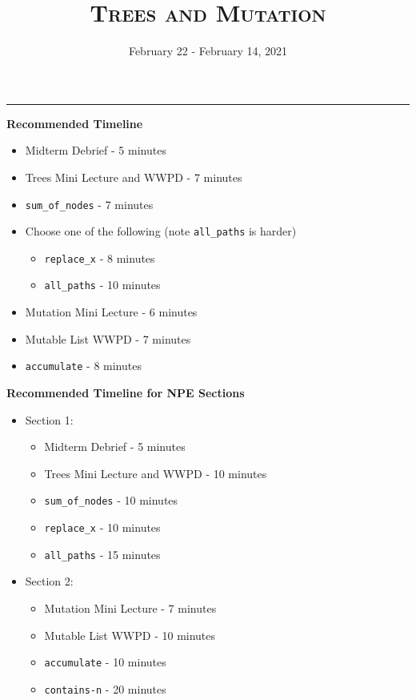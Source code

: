 \documentclass{exam}
\title{\textsc{Trees and Mutation}}
\date{February 22 - February 14, 2021}
\begin{document}
\maketitle
\rule{\textwidth}{0.15em}
\fontsize{12}{15}\selectfont


\begin{guide}
    \textbf{Recommended Timeline}
    \begin{itemize}
        \item Midterm Debrief - 5 minutes
        \item Trees Mini Lecture and WWPD - 7 minutes
        \item \lstinline{sum_of_nodes} - 7 minutes
        \item Choose one of the following (note \lstinline{all_paths} is harder)
            \begin{itemize}
            \item \lstinline{replace_x} - 8 minutes
            \item \lstinline{all_paths} - 10 minutes
            \end{itemize}
        \item Mutation Mini Lecture - 6 minutes
        \item Mutable List WWPD - 7 minutes
        \item \lstinline{accumulate} - 8 minutes
    \end{itemize}
    \vspace{.5cm}
    \textbf{Recommended Timeline for NPE Sections}
    \begin{itemize}
        \item Section 1:
            \begin{itemize}
            \item Midterm Debrief - 5 minutes
            \item Trees Mini Lecture and WWPD - 10 minutes
            \item \lstinline{sum_of_nodes} - 10 minutes
            \item \lstinline{replace_x} - 10 minutes
            \item \lstinline{all_paths} - 15 minutes
            \end{itemize} 
        \item Section 2:
            \begin{itemize}
            \item Mutation Mini Lecture - 7 minutes
            \item Mutable List WWPD - 10 minutes
            \item \lstinline{accumulate} - 10 minutes
            \item \lstinline{contains-n} - 20 minutes
            \end{itemize}
    \end{itemize}
\end{guide}
\end{document}
